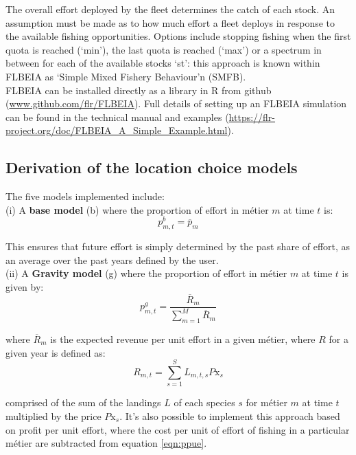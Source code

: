 \documentclass[12pt, halfline, a4paper]{ouparticle}
\begin{document}
The overall effort deployed by the fleet determines the catch of each stock. An
assumption must be made as to how much effort a fleet deploys in response to
the available fishing opportunities. Options include stopping fishing when the
first quota is reached (`min'), the last quota is reached (`max') or a spectrum
in between for each of the available stocks `st': this approach is known within
FLBEIA as `Simple Mixed Fishery Behaviour'n (SMFB).  \\

FLBEIA can be installed directly as a library in R from github
(\url{www.github.com/flr/FLBEIA}). Full details of setting up an FLBEIA
simulation can be found in the technical manual \citep{Garcia2017a} and
examples (\url{https://flr-project.org/doc/FLBEIA_A_Simple_Example.html}). 

\subsection{Derivation of the location choice models}

The five models implemented include:\\

(i) A \textbf{base model} (b) where the proportion of effort in métier $m$ at time
$t$ is:
\begin{equation}
p^{b}_{m,t} = \overline{p}_{m}
\end{equation}

This ensures that future effort is simply determined by the past share of
effort, as an average over the past years defined by the user. \\

(ii) A \textbf{Gravity model} (g) where the proportion of effort in métier $m$ at
time $t$ is given by: 
\begin{equation}
p^{g}_{m,t} = \frac{\overline{R}_{m}}{\sum\limits_{m=1}^{M}\overline{R}_{m}} 
\end{equation}

where $\overline{R}_m$ is the expected revenue per unit effort in a given
métier, where $R$ for a given year is defined as: 
\begin{equation}
R_{m,t} =  \sum\limits_{s=1}^{S} L_{m,t,s} P\text{x}_{s} 
\label{eqn:ppue}
\end{equation}

comprised of the sum of the landings $L$ of each species $s$ for métier $m$ at
time $t$ multiplied by the price $P\text{x}_{s}$. It's also possible to
implement this approach based on profit per unit effort, where the cost per
unit of effort of fishing in a particular métier are subtracted from equation
\ref{eqn:ppue}. \\
\end{document}
